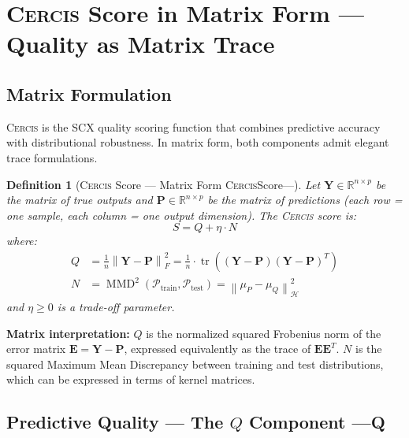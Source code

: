 \documentclass[12pt,a4paper]{article}
\newtheorem{definition}[theorem]{Definition}
\theoremstyle{definition}
\newcommand{\Cercis}{\textsc{Cercis}}
\newcommand{\SCX}{\textsc{SCX}}
\DeclareMathOperator{\tr}{tr}
\DeclareMathOperator{\MMD}{MMD}
\newcommand{\R}{\mathbb{R}}
\newcommand{\cH}{\mathcal{H}}
\newcommand{\cP}{\mathcal{P}}
\newcommand{\norm}[1]{\left\lVert#1\right\rVert}
\newcommand{\mat}[1]{\mathbf{#1}}
\begin{document}
\section{\Cercis{} Score in Matrix Form — Quality as Matrix Trace }
\label{sec:cercis_matrix}

\subsection{Matrix Formulation }

\Cercis{} is the \SCX{} quality scoring function that combines predictive accuracy 
with distributional robustness. In matrix form, both components admit elegant trace 
formulations.

\begin{definition}[\Cercis{} Score — Matrix Form \Cercis{}Score---]\label{def:cercis_matrix}
Let $\mat{Y} \in \R^{n \times p}$ be the matrix of true outputs and 
$\mat{P} \in \R^{n \times p}$ be the matrix of predictions (each row = one sample, 
each column = one output dimension). The \Cercis{} score is:
\begin{equation}\label{eq:cercis_score}
    \boxed{S = Q + \eta \cdot N}
\end{equation}
where:
\begin{align}
    Q &= \frac{1}{n} \norm{\mat{Y} - \mat{P}}_F^2 = \frac{1}{n} \cdot \tr\!\left((\mat{Y} - \mat{P})(\mat{Y} - \mat{P})^T\right) \label{eq:cercis_Q} \\
    N &= \MMD^2(\cP_{\text{train}}, \cP_{\text{test}}) = \norm{\mu_P - \mu_Q}_{\cH}^2 \label{eq:cercis_N}
\end{align}
and $\eta \geq 0$ is a trade-off parameter.
\end{definition}

\textbf{Matrix interpretation:} $Q$ is the normalized squared Frobenius norm of the 
error matrix $\mat{E} = \mat{Y} - \mat{P}$, expressed equivalently as the trace of 
$\mat{E}\mat{E}^T$. $N$ is the squared Maximum Mean Discrepancy between training and 
test distributions, which can be expressed in terms of kernel matrices.

\subsection{Predictive Quality — The $Q$ Component ---Q}
\end{document}
